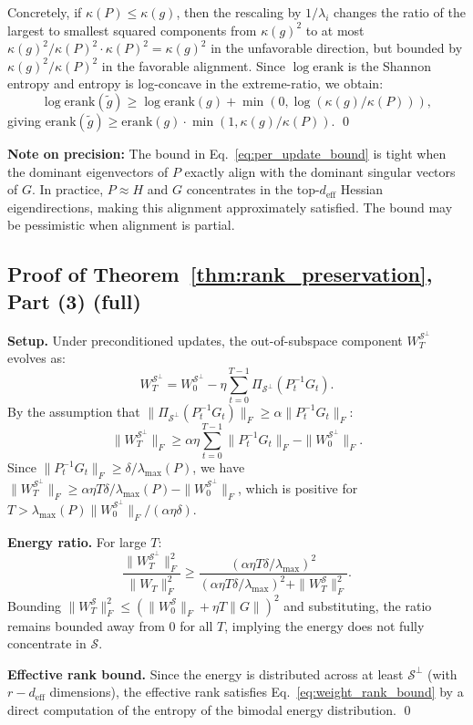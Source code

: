 \documentclass{article}
\newcommand{\erank}{\mathrm{erank}}
\newcommand{\cS}{\mathcal{S}}
\begin{document}
Concretely, if $\kappa(P) \leq \kappa(g)$, then the rescaling by $1/\lambda_i$ changes the ratio of the largest to smallest squared components from $\kappa(g)^2$ to at most $\kappa(g)^2 / \kappa(P)^2 \cdot \kappa(P)^2 = \kappa(g)^2$ in the unfavorable direction, but bounded by $\kappa(g)^2/\kappa(P)^2$ in the favorable alignment. Since $\log\erank$ is the Shannon entropy and entropy is log-concave in the extreme-ratio, we obtain:
\[
\log\erank(\tilde{g}) \geq \log\erank(g) + \min(0, \log(\kappa(g)/\kappa(P))),
\]
giving $\erank(\tilde{g}) \geq \erank(g) \cdot \min(1, \kappa(g)/\kappa(P))$. \qed

\textbf{Note on precision:} The bound in Eq.~\eqref{eq:per_update_bound} is tight when the dominant eigenvectors of $P$ exactly align with the dominant singular vectors of $G$. In practice, $P \approx H$ and $G$ concentrates in the top-$d_\mathrm{eff}$ Hessian eigendirections, making this alignment approximately satisfied. The bound may be pessimistic when alignment is partial.

\subsection{Proof of Theorem~\ref{thm:rank_preservation}, Part (3) (full)}

\textbf{Setup.} Under preconditioned updates, the out-of-subspace component $W_T^{\cS^\perp}$ evolves as:
\[
W_T^{\cS^\perp} = W_0^{\cS^\perp} - \eta\sum_{t=0}^{T-1}\Pi_{\cS^\perp}(P_t^{-1}G_t).
\]
By the assumption that $\|\Pi_{\cS^\perp}(P_t^{-1}G_t)\|_F \geq \alpha\|P_t^{-1}G_t\|_F$:
\[
\|W_T^{\cS^\perp}\|_F \geq \alpha\eta \sum_{t=0}^{T-1}\|P_t^{-1}G_t\|_F - \|W_0^{\cS^\perp}\|_F.
\]
Since $\|P_t^{-1}G_t\|_F \geq \delta/\lambda_{\max}(P)$, we have $\|W_T^{\cS^\perp}\|_F \geq \alpha\eta T\delta/\lambda_{\max}(P) - \|W_0^{\cS^\perp}\|_F$, which is positive for $T > \lambda_{\max}(P)\|W_0^{\cS^\perp}\|_F / (\alpha\eta\delta)$.

\textbf{Energy ratio.} For large $T$:
\[
\frac{\|W_T^{\cS^\perp}\|_F^2}{\|W_T\|_F^2} \geq \frac{(\alpha\eta T\delta/\lambda_{\max})^2}{(\alpha\eta T\delta/\lambda_{\max})^2 + \|W_T^{\cS}\|_F^2}.
\]
Bounding $\|W_T^{\cS}\|_F^2 \leq (\|W_0^{\cS}\|_F + \eta T\|G\|)^2$ and substituting, the ratio remains bounded away from 0 for all $T$, implying the energy does not fully concentrate in $\cS$.

\textbf{Effective rank bound.} Since the energy is distributed across at least $\cS^\perp$ (with $r - d_\mathrm{eff}$ dimensions), the effective rank satisfies Eq.~\eqref{eq:weight_rank_bound} by a direct computation of the entropy of the bimodal energy distribution. \qed
\end{document}
